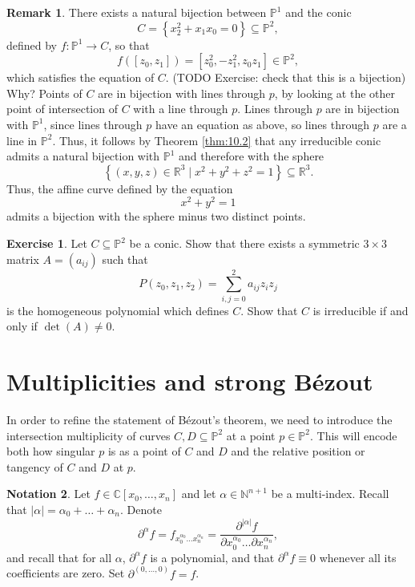 \documentclass{article}
\newcommand{\N}{\mathbb{N}}
\newcommand{\R}{\mathbb{R}}
\newcommand{\C}{\mathbb{C}}
\renewcommand{\P}{\mathbb{P}}
\newcommand{\rb}[1]{\left( #1 \right)}
\renewcommand{\sb}[1]{\left[ #1 \right]}
\newcommand{\cb}[1]{\left\{ #1 \right\}}
\newcommand{\abs}[1]{\left\lvert #1 \right\rvert}
\theoremstyle{definition}\newtheorem{definition}{Definition}[section]
\theoremstyle{definition}\newtheorem{notation}[definition]{Notation}
\theoremstyle{definition}\newtheorem{remark}[definition]{Remark}
\theoremstyle{definition}\newtheorem{example}[definition]{Example}
\theoremstyle{definition}\newtheorem{fact}{Fact}
\theoremstyle{definition}\newtheorem{exercise}{Exercise}
\begin{document}
\begin{remark}
There exists a natural bijection between $ \P^1 $ and the conic
$$ C = \cb{x_2^2 + x_1x_0 = 0} \subseteq \P^2, $$
defined by $ f : \P^1 \to C $, so that
$$ f\rb{\sb{z_0, z_1}} = \sb{z_0^2, -z_1^2, z_0z_1} \in \P^2, $$
which satisfies the equation of $ C $. (TODO Exercise: check that this is a bijection) Why? Points of $ C $ are in bijection with lines through $ p $, by looking at the other point of intersection of $ C $ with a line through $ p $. Lines through $ p $ are in bijection with $ \P^1 $, since lines through $ p $ have an equation as above, so lines through $ p $ are a line in $ \P^2 $. Thus, it follows by Theorem \ref{thm:10.2} that any irreducible conic admits a natural bijection with $ \P^1 $ and therefore with the sphere
$$ \cb{\rb{x, y, z} \in \R^3 \mid x^2 + y^2 + z^2 = 1} \subseteq \R^3. $$
Thus, the affine curve defined by the equation
$$ x^2 + y^2 = 1 $$
admits a bijection with the sphere minus two distinct points.
\end{remark}

\begin{exercise}
Let $ C \subseteq \P^2 $ be a conic. Show that there exists a symmetric $ 3 \times 3 $ matrix $ A = \rb{a_{ij}} $ such that
$$ P\rb{z_0, z_1, z_2} = \sum_{i, j = 0}^2 a_{ij}z_iz_j $$
is the homogeneous polynomial which defines $ C $. Show that $ C $ is irreducible if and only if $ \det\rb{A} \ne 0 $.
\end{exercise}

\section{Multiplicities and strong Bézout}

In order to refine the statement of Bézout's theorem, we need to introduce the intersection multiplicity of curves $ C, D \subseteq \P^2 $ at a point $ p \in \P^2 $. This will encode both how singular $ p $ is as a point of $ C $ and $ D $ and the relative position or tangency of $ C $ and $ D $ at $ p $.

\begin{notation}
Let $ f \in \C\sb{x_0, \dots, x_n} $ and let $ \alpha \in \N^{n + 1} $ be a multi-index. Recall that $ \abs{\alpha} = \alpha_0 + \dots + \alpha_n $. Denote
$$ \partial^\alpha f = f_{x_0^{\alpha_0} \dots x_n^{\alpha_n}} = \dfrac{\partial^{\abs{\alpha}} f}{\partial x_0^{\alpha_0} \dots \partial x_n^{\alpha_n}}, $$
and recall that for all $ \alpha $, $ \partial^\alpha f $ is a polynomial, and that $ \partial^\alpha f \equiv 0 $ whenever all its coefficients are zero. Set $ \partial^{\rb{0, \dots, 0}} f = f $.
\end{notation}
\end{document}

